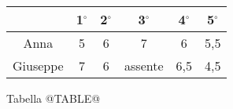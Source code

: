 \begin{tabular}{ | c | c | c | c | c | c | }
\hline
& 1$^\circ$ & 2$^\circ$ & 3$^\circ$ & 4$^\circ$ & 5$^\circ$ \\
\hline
Anna & 5 & 6 & 7 & 6 & 5,5  \\
\hline
Giuseppe & 7 & 6 & assente & 6,5 & 4,5 \\
\hline
\end{tabular}
\vspace{.1cm}

Tabella @TABLE@
\vspace{.2cm}
